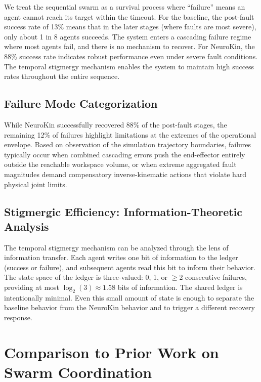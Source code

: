 \documentclass[12pt,a4paper,oneside]{report}
\begin{document}
We treat the sequential swarm as a survival process where ``failure'' means an agent cannot reach its target within the timeout. For the baseline, the post-fault success rate of 13\% means that in the later stages (where faults are most severe), only about 1 in 8 agents succeeds. The system enters a cascading failure regime where most agents fail, and there is no mechanism to recover. For NeuroKin, the 88\% success rate indicates robust performance even under severe fault conditions. The temporal stigmergy mechanism enables the system to maintain high success rates throughout the entire sequence.

\subsection{Failure Mode Categorization}
\label{subsec:failure_mode_categorization}

While NeuroKin successfully recovered 88\% of the post-fault stages, the remaining 12\% of failures highlight limitations at the extremes of the operational envelope. Based on observation of the simulation trajectory boundaries, failures typically occur when combined cascading errors push the end-effector entirely outside the reachable workspace volume, or when extreme aggregated fault magnitudes demand compensatory inverse-kinematic actions that violate hard physical joint limits.

\subsection{Stigmergic Efficiency: Information-Theoretic Analysis}
\label{subsec:stigmergic_efficiency_information_theoretic_analysis}

The temporal stigmergy mechanism can be analyzed through the lens of information transfer. Each agent writes one bit of information to the ledger (success or failure), and subsequent agents read this bit to inform their behavior. The state space of the ledger is three-valued: 0, 1, or $\geq$2 consecutive failures, providing at most $\log_2(3) \approx 1.58$ bits of information. The shared ledger is intentionally minimal. Even this small amount of state is enough to separate the baseline behavior from the NeuroKin behavior and to trigger a different recovery response.

\section{Comparison to Prior Work on Swarm Coordination}
\end{document}
